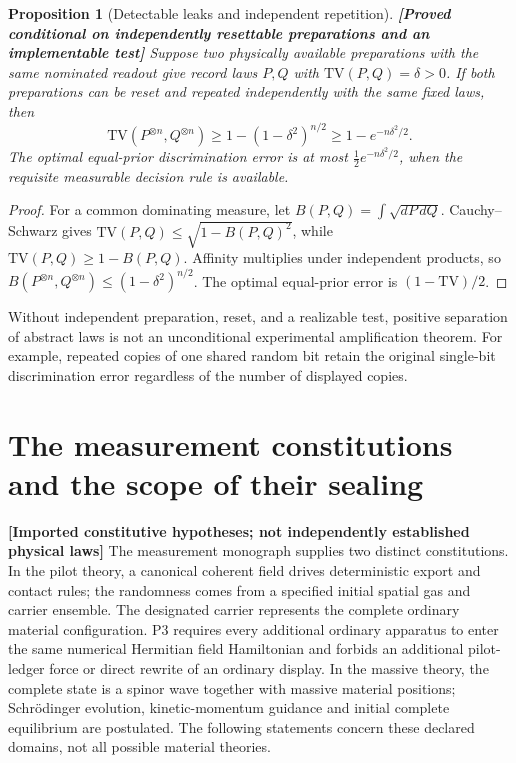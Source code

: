 \documentclass[11pt,a4paper]{article}
\newtheorem{proposition}[theorem]{Proposition}
\theoremstyle{definition}
\theoremstyle{remark}\newtheorem{remark}[theorem]{Remark}
\newcommand{\status}[1]{\textbf{[#1]}\quad}
\newcommand{\TV}{\mathrm{TV}}
\begin{document}
\begin{proposition}[Detectable leaks and independent repetition]
\label{ctx:amplification}
\status{Proved conditional on independently resettable preparations and an implementable test}
Suppose two physically available preparations with the same nominated
readout give record laws $P,Q$ with $\TV(P,Q)=\delta>0$.
If both preparations can be reset and repeated independently with the
same fixed laws, then
\[
 \TV(P^{\otimes n},Q^{\otimes n})\ge
 1-(1-\delta^2)^{n/2}\ge1-e^{-n\delta^2/2}.
\]
The optimal equal-prior discrimination error is at most
$\frac12e^{-n\delta^2/2}$, when the requisite measurable decision rule
is available.
\end{proposition}
\begin{proof}
For a common dominating measure, let
$B(P,Q)=\int\sqrt{dP\,dQ}$. Cauchy--Schwarz gives
$\TV(P,Q)\le\sqrt{1-B(P,Q)^2}$, while
$\TV(P,Q)\ge1-B(P,Q)$. Affinity multiplies under independent products,
so $B(P^{\otimes n},Q^{\otimes n})\le(1-\delta^2)^{n/2}$.
The optimal equal-prior error is $(1-\TV)/2$.
\end{proof}

Without independent preparation, reset, and a realizable test,
positive separation of abstract laws is not an unconditional experimental
amplification theorem. For example, repeated copies of one shared random
bit retain the original single-bit discrimination error regardless of
the number of displayed copies.


\section{The measurement constitutions and the scope of their sealing}
\label{con:section}
\status{Imported constitutive hypotheses; not independently established physical laws}
The measurement monograph supplies two distinct constitutions. In the pilot theory, a canonical coherent field drives deterministic export and contact rules; the randomness comes from a specified initial spatial gas and carrier ensemble. The designated carrier represents the complete ordinary material configuration. P3 requires every additional ordinary apparatus to enter the same numerical Hermitian field Hamiltonian and forbids an additional pilot-ledger force or direct rewrite of an ordinary display. In the massive theory, the complete state is a spinor wave together with massive material positions; Schr\"odinger evolution, kinetic-momentum guidance and initial complete equilibrium are postulated. The following statements concern these declared domains, not all possible material theories.
\end{document}
